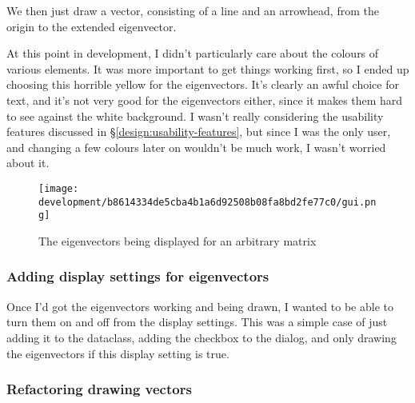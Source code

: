 \documentclass[../development.tex]{subfiles}
\begin{document}
We then just draw a vector, consisting of a line and an arrowhead, from the origin to the extended eigenvector.



At this point in development, I didn't particularly care about the colours of various elements. It was more important to get things working first, so I ended up choosing \textcolor[RGB]{255, 249, 0}{this horrible yellow} for the eigenvectors. It's clearly an awful choice for text, and it's not very good for the eigenvectors either, since it makes them hard to see against the white background. I wasn't really considering the usability features discussed in \S\ref{design:usability-features}, but since I was the only user, and changing a few colours later on wouldn't be much work, I wasn't worried about it.

\begin{figure}[H]
	\centering
	\texttt{[image: development/b8614334de5cba4b1a6d92508b08fa8bd2fe77c0/gui.png]}
	\caption{The eigenvectors being displayed for an arbitrary matrix}
	\label{fig:development:b8614334de5cba4b1a6d92508b08fa8bd2fe77c0:gui.png}
\end{figure}

\subsubsection{Adding display settings for eigenvectors\label{development:implementing-eigenstuffs:adding-display-settings-for-eigenvectors}}

Once I'd got the eigenvectors working and being drawn, I wanted to be able to turn them on and off from the display settings. This was a simple case of just adding it to the  dataclass, adding the checkbox to the dialog, and only drawing the eigenvectors if this display setting is true.




\subsubsection{Refactoring drawing vectors\label{development:implementing-eigenvectors:refactoring-drawing-vectors}}
\end{document}
